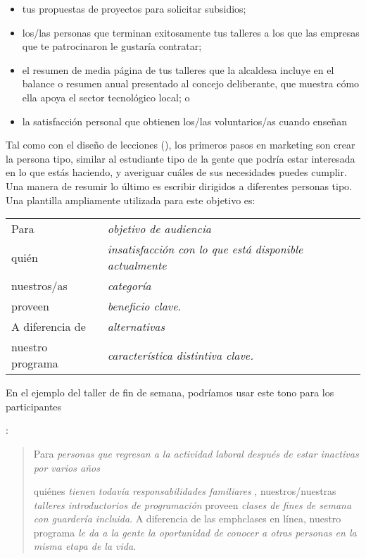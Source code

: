 \begin{itemize}

\item
  tus propuestas de proyectos para solicitar subsidios;

\item
 
los/las personas que terminan exitosamente tus talleres
a los que las empresas que te patrocinaron le gustaría contratar;

\item
   el resumen de media página de tus talleres que la alcaldesa incluye 
   en el balance o resumen anual presentado al concejo deliberante,  
   que muestra cómo ella apoya el sector tecnológico local;
o

\item
   la satisfacción personal que obtienen los/las voluntarios/as cuando enseñan
\end{itemize}

Tal como con el diseño de lecciones (),
los primeros pasos en marketing son crear
la persona tipo, similar al estudiante tipo
de la gente que podría estar interesada en lo que estás haciendo, 
y averiguar cuáles de sus necesidades puedes cumplir.
Una manera de resumir lo último es escribir  
dirigidos a diferentes personas tipo.
Una plantilla ampliamente utilizada para este objetivo es:

\newpage
\begin{longtable}{ll}
  Para        & \emph{ objetivo de audiencia} \\
  quién        & \emph{ insatisfacción con lo que está disponible actualmente} \\
  nuestros/as        & \emph{categoría} \\
  proveen    & \emph{beneficio clave}. \\
  A diferencia de    & \emph{alternativas} \\
  nuestro programa    & \emph{característica distintiva clave.}
\end{longtable}

\noindent
En el ejemplo del taller de fin de semana,
podríamos usar este tono para los participantes

:
\begin{quote}

Para \emph{personas que regresan a la actividad laboral después de estar inactivas por varios años}

quiénes \emph{tienen todavía responsabilidades familiares },
nuestros/nuestras \emph{talleres introductorios de programación}
proveen \emph{clases de fines de semana con guardería incluida}.
A diferencia de las emph{clases en línea},
nuestro programa \emph{le da a la gente la oportunidad de conocer a otras personas en la misma etapa de la vida}.

\end{quote}

